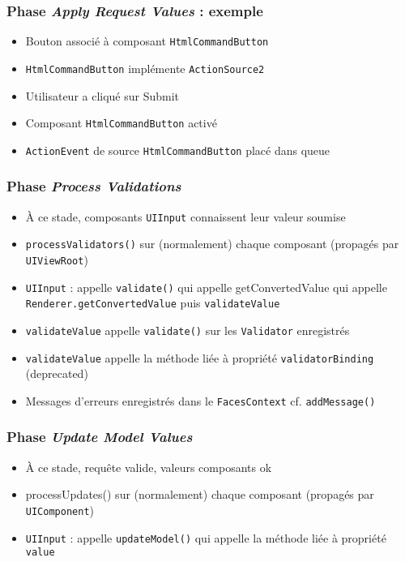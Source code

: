 \documentclass[english, french]{beamer}
\begin{document}
\begin{frame}
	\frametitle{Phase \emph{Apply Request Values} : exemple}
	\begin{itemize}
		\item Bouton associé à composant \texttt{HtmlCommandButton} 
		\item \texttt{HtmlCommandButton} implémente \texttt{ActionSource2}
		\item Utilisateur a cliqué sur \og{}Submit\fg{}
		\item Composant \texttt{HtmlCommandButton} activé
		\item \texttt{ActionEvent} de source \texttt{HtmlCommandButton} placé dans queue
	\end{itemize}
\end{frame}

\begin{frame}
	\frametitle{Phase \emph{Process Validations}}
	\begin{itemize}
		\item À ce stade, composants \texttt{UIInput} connaissent leur valeur soumise
		\item \texttt{processValidators()} sur {\tiny (normalement)} chaque composant (propagés par \texttt{UIViewRoot})
		\item \texttt{UIInput} : appelle {\tiny \texttt{validate()} qui appelle {getConvertedValue} qui appelle} \texttt{Renderer.getConvertedValue} puis \texttt{validateValue}
		\item \texttt{validateValue} appelle \texttt{validate()} sur les \texttt{Validator} enregistrés
		\item \texttt{validateValue} appelle la méthode liée à propriété \texttt{validatorBinding} (deprecated)
		\item Messages d’erreurs enregistrés dans le \texttt{FacesContext} {\tiny cf. \texttt{addMessage()}}
	\end{itemize}
\end{frame}

\begin{frame}[label=ph-umv]
	\frametitle{Phase \emph{Update Model Values}}
	\begin{itemize}
		\item À ce stade, requête valide, valeurs composants ok
		\item processUpdates() sur {\tiny (normalement)} chaque composant (propagés par \texttt{UIComponent})
		\item \texttt{UIInput} : appelle {\tiny \texttt{updateModel()} qui appelle} la méthode liée à propriété \texttt{value}
	\end{itemize}
\end{frame}
\end{document}
